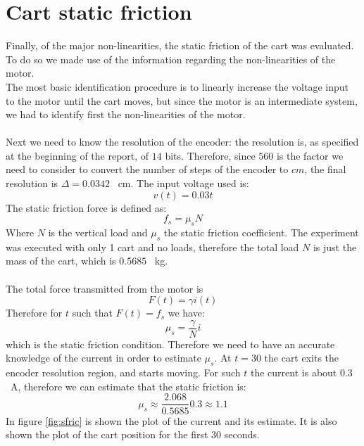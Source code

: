 \section{Cart static friction}
Finally, of the major non-linearities, the static friction of the cart was evaluated. To do so we made use of the information regarding the non-linearities of the motor. \\
The most basic identification procedure is to linearly increase the voltage input to the motor until the cart moves, but since the motor is an intermediate system, we had to identify first the non-linearities of the motor.\\ \\
Next we need to know the resolution of the encoder: the resolution is, as specified at the beginning of the report, of $14$ bits. Therefore, since $560$ is the factor we need to consider to convert the number of steps of the encoder to $cm$, the final resolution is $\Delta = 0.0342$ \SI{}{\centi \metre}. The input voltage used is:
\begin{equation}
v(t) = 0.03t
\end{equation}
The static friction force is defined as:
\begin{equation}
f_s = \mu_s  N
\end{equation}
Where $N$ is the vertical load and $\mu_s$ the static friction coefficient. The experiment was executed with only 1 cart and no loads, therefore the total load $N$ is just the mass of the cart, which is $0.5685$ \SI{}{\kilo \gram}.\\ \\
The total force transmitted from the motor is \begin{equation}
F(t) = \gamma i(t)
\end{equation}
Therefore for $t$ such that $F(t)=f_s$ we have:
\begin{equation}
\mu_s = \frac{\gamma}{N} i
\end{equation}
which is the static friction condition. Therefore we need to have an accurate knowledge of the current in order to estimate $\mu_s$. 
At $t=30$ the cart exits the encoder resolution region, and starts moving. For such $t$ the current is about $0.3$ \SI{}{\ampere}, therefore we can estimate that the static friction is:
\begin{equation}
\mu_s \approx \frac{2.068}{0.5685}0.3 \approx 1.1
\end{equation}
In figure \ref{fig:sfric} is shown the plot of the current and its estimate. It is also shown the plot of the cart position for the first $30$ seconds. 
